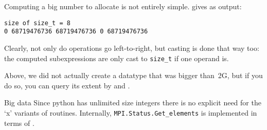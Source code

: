 \begin{mpifour}

\begin{remark}
  Computing a big number to allocate is not entirely simple.
  gives as output:
\begin{verbatim}
size of size_t = 8
0 68719476736 68719476736 0 68719476736
\end{verbatim}
Clearly, not only do operations go left-to-right, but casting is done that way too:
the computed subexpressions are only cast to \lstinline{size_t} if one operand is.
\end{remark}

Above, we did not actually create a datatype that was bigger than~2G,
but if you do so, you can query its extent by
and
.

\begin{pythonnote}{Big data}
  Since python has unlimited size integers there is
  no explicit need for the `x' variants of routines.
  Internally, \lstinline+MPI.Status.Get_elements+ is implemented
  in terms of .
\end{pythonnote}

\end{mpifour}


